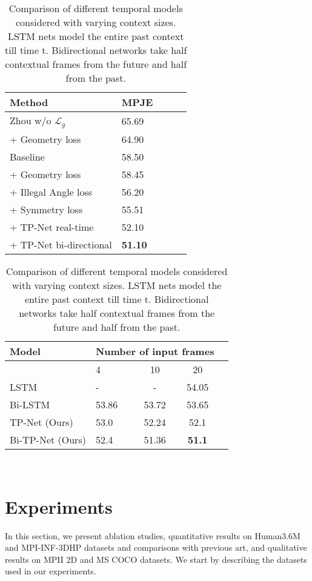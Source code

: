 \documentclass[runningheads]{llncs}
\begin{document}
	 
\begin{table}[!bht]
\centering
\footnotesize
\parbox{.40\linewidth}{

\begin{tabular}{ l  l  c  c c  }
{\bf Method} & {\bf MPJE}\\
\hline
Zhou w/o $\mathcal{L}_g$~\cite{Zhou_2017_ICCV}& 65.69\\
 + Geometry loss & 64.90\\
\hline
Baseline & 58.50\\
 + Geometry loss & 58.45\\ 
 + Illegal Angle loss & 56.20\\
 + Symmetry loss & 55.51\\
 + TP-Net real-time & 52.10\\
 + TP-Net bi-directional & \textbf{51.10}\\
\hline
\end{tabular} 
\vskip 2mm
\caption{Ablation of different loss terms on Human3.6M using Protocol 1.}
\label{tab:ablation}
}
\hspace{1em}
\parbox{.45\linewidth}{

  \begin{tabular}{l  l  c  c c  }
     {\bf Model} &
      \multicolumn{3}{c}{\bf Number of input frames} \\
      \hline
      & 4 & 10 & 20\\
    \hline
    LSTM & - & - & 54.05 \\
    Bi-LSTM & 53.86 & 53.72 & 53.65 \\
    TP-Net (Ours) & 53.0 & 52.24 & 52.1 \\
    Bi-TP-Net (Ours) & 52.4 & 51.36 & \textbf{51.1} \\
    \hline
  \end{tabular}
\vskip 2mm
\caption{Comparison of different temporal models considered with varying context sizes. LSTM nets model the entire past context till time t. Bidirectional networks take half contextual frames from the future and half from the past.}
\label{tab:lstmComp}
}\\
\end{table}


\section{Experiments} \label{experiments}
In this section, we present ablation studies, quantitative results on Human3.6M and MPI-INF-3DHP datasets and comparisons with previous art, and qualitative results on MPII 2D and MS COCO datasets. We start by describing the datasets used in our experiments.
\end{document}
